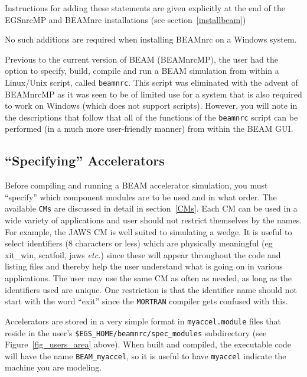 \documentclass[12pt,twoside]{article}
\newcommand{\etc}{{\em etc.}}
\begin{document}
Instructions for adding these statements are given explicitly at the
end of the EGSnrcMP and BEAMnrc installations (see section~\ref{installbeam})

No such additions are required when installing BEAMnrc on a Windows system.

Previous to the current version of BEAM (BEAMnrcMP), the user had the
option to specify, build, compile and run a BEAM simulation
from within a Linux/Unix script, called {\tt beamnrc}. 
This script was eliminated with the advent of BEAMnrcMP as it was seen to
be of limited use for a system that is also required to work on
Windows (which does not support scripts).  However, you will note
in the descriptions that follow that all of the functions of the
{\tt beamnrc} script can be performed (in a much more user-friendly
manner) from within the BEAM GUI.

\subsection{``Specifying'' Accelerators}

Before compiling and running a BEAM accelerator simulation, you must
``specify'' which component modules are to be used and in what order.
The available
\verb+CMs+ are discussed in detail in section~\ref{CMs}.  Each CM can be
used in a wide variety of applications and user should not restrict
themselves by the names. For example, the JAWS CM is well suited to
simulating a wedge.  It is useful to select identifiers (8 characters or
less) which are physically meaningful (eg xit\_win, scatfoil, jaws \etc)
since these will appear throughout the code and listing files and thereby
help the user understand
what is going on in various applications.  The user may use the same CM
as often as needed, as long as the identifiers used are unique.
One restriction is that the identifier name should not start with the
word ``exit'' since the \verb+MORTRAN+ compiler gets confused with this.

Accelerators are stored in a very simple format in
{\tt myaccel.module} files that reside in the
user's {\tt \$EGS\_HOME/beamnrc/spec\_modules} subdirectory (see
Figure~\ref{fig_users_area} above).  When built and compiled, the
executable code will have the name {\tt BEAM\_myaccel}, so
it is useful to have {\tt myaccel} indicate the machine you are
modeling.
\end{document}
